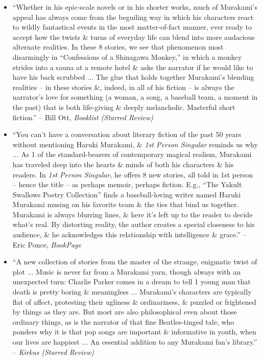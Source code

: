 \documentclass{article}
\begin{document}
\begin{enumerate}
\begin{itemize}
		\item ``Whether in his epic-scale novels or in his shorter works, much of {\sc Murakami}'s appeal has always come from the beguiling way in which his characters react to wildly fantastical events in the most matter-of-fact manner, ever ready to accept how the twists \& turns of everyday life can blend into more audacious alternate realities. In these 8 stories, we see that phenomenon most disarmingly in ``Confessions of a Shinagawa Monkey,'' in which a monkey strides into a sauna at a remote hotel \& asks the narrator if he would like to have his back scrubbed $\ldots$ The glue that holds together {\sc Murakami}'s blending realities -- in these stories \&, indeed, in all of his fiction -- is always the narrator's love for something (a woman, a song, a baseball team, a moment in the past) that is both life-giving \& deeply melancholic. Masterful short fiction.'' -- {\sc Bill Ott}, {\it Booklist (Starred Review)}
		\item ``You can't have a conversation about literary fiction of the past 50 years without mentioning {\sc Haruki Murakami}, \& {\it1st Person Singular} reminds us why $\ldots$ As 1 of the standard-bearers of contemporary magical realism, {\sc Murakami} has traveled deep into the hearts \& minds of both his characters \& his readers. In {\it1st Person Singular}, he offers 8 new stories, all told in 1st person -- hence the title -- as perhaps memoir, perhaps fiction. E.g., ``The Yakult Swallows Poetry Collection'' finds a baseball-loving writer named {\sc Haruki Murakami} musing on his favorite team \& the ties that bind us together. {\sc Murakami} is always blurring lines, \& here it's left up to the reader to decide what's real. By distorting reality, the author creates a special closeness to his audience, \& he acknowledges this relationship with intelligence \& grace.'' -- {\sc Eric Ponce}, {\it BookPage}
		\item ``A new collection of stories from the master of the strange, enigmatic twist of plot $\ldots$ Music is never far from a {\sc Murakami} yarn, though always with an unexpected turn: {\sc Charlie Parker} comes in a dream to tell 1 young man that death is pretty boring \& meaningless $\ldots$ {\sc Murakami}'s characters are typically flat of affect, protesting their ugliness \& ordinariness, \& puzzled or frightened by things as they are. But most are also philosophical even about those ordinary things, as is the narrator of that fine Beatles-tinged tale, who ponders why it is that pop songs are important \& informative in youth, when our lives are happiest $\ldots$ An essential addition to any {\sc Murakami} fan's library.'' -- {\it Kirkus (Starred Review)}

\end{itemize}
\end{enumerate}
\end{document}
